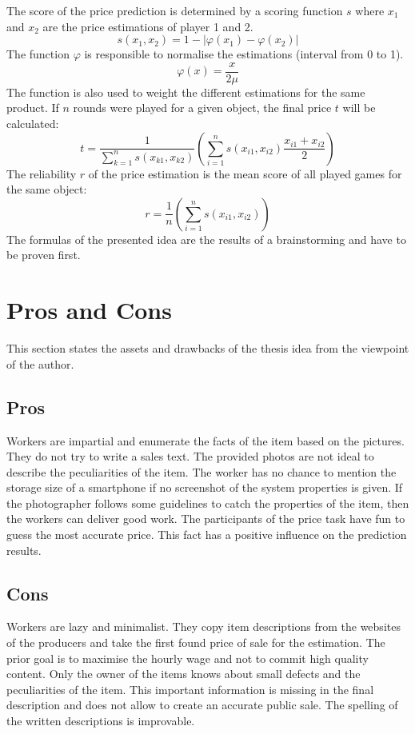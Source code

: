 The score of the price prediction is determined by a scoring function \( s \) where \( x_1 \) and \( x_2 \) are the price estimations of player 1 and 2.
\begin{equation}
s(x_1,x_2) = 1 - |\varphi(x_1) - \varphi(x_2)|
\end{equation}
The function \( \varphi \) is responsible to normalise the estimations (interval from 0 to 1).
\begin{equation}
\varphi(x) = \frac{x}{2\mu}
\end{equation}
The function is also used to weight the different estimations for the same product. If \( n \) rounds were played for a given object, the final price \( t \) will be calculated:
\begin{equation}
t = \frac{1}{\sum_{k=1}^{n} s(x_{k1},x_{k2})}\left(\sum_{i=1}^{n} s(x_{i1},x_{i2})\frac{x_{i1}+x_{i2}}{2}\right)
\end{equation}
The reliability \( r \) of the price estimation is the mean score of all played games for the same object:
\begin{equation}
r = \frac{1}{n}\left(\sum_{i=1}^{n} s(x_{i1},x_{i2})\right)
\end{equation}
The formulas of the presented idea are the results of a brainstorming and have to be proven first.
\section{Pros and Cons}
This section states the assets and drawbacks of the thesis idea from the viewpoint of the author.
\subsection{Pros}
Workers are impartial and enumerate the facts of the item based on the pictures. They do not try to write a sales text. The provided photos are not ideal to describe the peculiarities of the item. The worker has no chance to mention the storage size of a smartphone if no screenshot of the system properties is given. If the photographer follows some guidelines to catch the properties of the item, then the workers can deliver good work. The participants of the price task have fun to guess the most accurate price. This fact has a positive influence on the prediction results. 
\subsection{Cons}
Workers are lazy and minimalist. They copy item descriptions from the websites of the producers and take the first found price of sale for the estimation. The prior goal is to maximise the hourly wage and not to commit high quality content. Only the owner of the items knows about small defects and the peculiarities of the item. This important information is missing in the final description and does not allow to create an accurate public sale. The spelling of the written descriptions is improvable.
